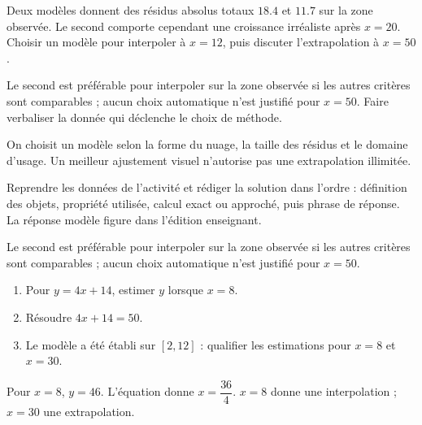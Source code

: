 \begin{activity}
Deux modèles donnent des résidus absolus totaux $\num{18,4}$ et $\num{11,7}$ sur la zone observée. Le second comporte cependant une croissance irréaliste après $x=20$. Choisir un modèle pour interpoler à $x=12$, puis discuter l'extrapolation à $x=50$.
\begin{center}\end{center}
\end{activity}
\begin{solution}Le second est préférable pour interpoler sur la zone observée si les autres critères sont comparables ; aucun choix automatique n'est justifié pour $x=50$. Faire verbaliser la donnée qui déclenche le choix de méthode.\end{solution}

\begin{summary}On choisit un modèle selon la forme du nuage, la taille des résidus et le domaine d'usage. Un meilleur ajustement visuel n'autorise pas une extrapolation illimitée.\end{summary}

\begin{example}
Reprendre les données de l'activité et rédiger la solution dans l'ordre : définition des objets, propriété utilisée, calcul exact ou approché, puis phrase de réponse. La réponse modèle figure dans l'édition enseignant.
\end{example}
\begin{solution}Le second est préférable pour interpoler sur la zone observée si les autres critères sont comparables ; aucun choix automatique n'est justifié pour $x=50$.\end{solution}

\begin{exercise}[essentiel]
\begin{enumerate}\item Pour $y=4x+14$, estimer $y$ lorsque $x=8$.\item Résoudre $4x+14=50$.\item Le modèle a été établi sur $[2,12]$ : qualifier les estimations pour $x=8$ et $x=30$.\end{enumerate}
\end{exercise}
\begin{solution}Pour $x=8$, $y=46$. L'équation donne $x=\dfrac{36}{4}$. $x=8$ donne une interpolation ; $x=30$ une extrapolation.\end{solution}

